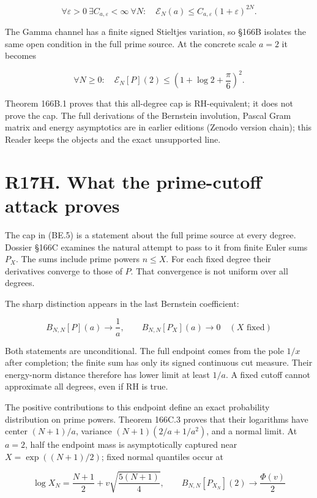 \documentclass[
  11pt,
]{book}
\begin{document}
\[
\boxed{\forall\varepsilon>0\ \exists C_{a,\varepsilon}<\infty\ \forall N:\quad
\mathscr E_N(a)\le C_{a,\varepsilon}(1+\varepsilon)^{2N}.}
\tag{BE.3}
\]

The Gamma channel has a finite signed Stieltjes variation, so §166B
isolates the same open condition in the full prime source. At the
concrete scale \(a=2\) it becomes

\[
\boxed{\forall N\ge0:\quad
\mathscr E_N[P](2)\le\left(1+\log2+\frac\pi6\right)^2.}
\tag{BE.5}
\]

Theorem 166B.1 proves that this all-degree cap is RH-equivalent; it does
not prove the cap. The full derivations of the Bernstein involution,
Pascal Gram matrix and energy asymptotics are in earlier editions
(Zenodo version chain); this Reader keeps the objects and the exact
unsupported line.

\section{R17H. What the prime-cutoff attack
proves}\label{r17h.-what-the-prime-cutoff-attack-proves}

The cap in (BE.5) is a statement about the full prime source at every
degree. Dossier §166C examines the natural attempt to pass to it from
finite Euler sums \(P_X\). The sums include prime powers \(n\le X\). For
each fixed degree their derivatives converge to those of \(P\). That
convergence is not uniform over all degrees.

The sharp distinction appears in the last Bernstein coefficient:

\[
\boxed{B_{N,N}[P](a)\to\frac1a,\qquad
B_{N,N}[P_X](a)\to0\quad(X\text{ fixed})}
\tag{CUT.1}
\]

Both statements are unconditional. The full endpoint comes from the pole
\(1/x\) after completion; the finite sum has only its signed continuous
cut measure. Their energy-norm distance therefore has lower limit at
least \(1/a\). A fixed cutoff cannot approximate all degrees, even if RH
is true.

The positive contributions to this endpoint define an exact probability
distribution on prime powers. Theorem 166C.3 proves that their
logarithms have center \((N+1)/a\), variance \((N+1)(2/a+1/a^2)\), and a
normal limit. At \(a=2\), half the endpoint mass is asymptotically
captured near \(X=\exp((N+1)/2)\); fixed normal quantiles occur at

\[
\boxed{\log X_N=\frac{N+1}{2}
+v\sqrt{\frac{5(N+1)}4},\qquad
B_{N,N}[P_{X_N}](2)\to\frac{\Phi(v)}2}
\tag{CUT.2}
\]
\end{document}

